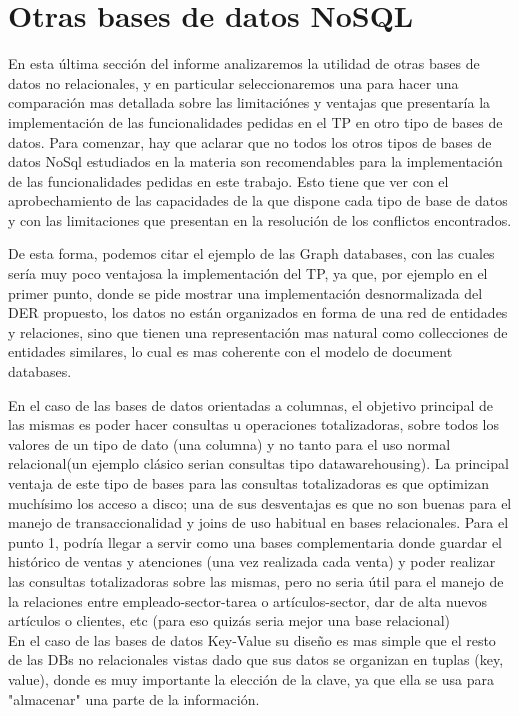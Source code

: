 \section{Otras bases de datos NoSQL}

En esta \'ultima secci\'on del informe analizaremos la utilidad de otras bases de datos no relacionales, y en particular seleccionaremos una para hacer una comparaci\'on mas detallada sobre las limitaci\'ones y ventajas que presentar\'ia la implementaci\'on de las funcionalidades pedidas en el TP en otro tipo de bases de datos. Para comenzar, hay que aclarar que no todos los otros tipos de bases de datos NoSql estudiados en la materia son recomendables para la implementaci\'on de las funcionalidades pedidas en este trabajo. Esto tiene que ver con el aprobechamiento de las capacidades de la que dispone cada tipo de base de datos y con las limitaciones que presentan en la resoluci\'on de los conflictos encontrados. 

De esta forma, podemos citar el ejemplo de las Graph databases, con las cuales ser\'ia muy poco ventajosa la implementaci\'on del TP, ya que, por ejemplo en el primer punto, donde se pide mostrar una implementaci\'on desnormalizada del DER propuesto, los datos no est\'an organizados en forma de una red de entidades y relaciones, sino que tienen una representaci\'on mas natural como collecciones de entidades similares, lo cual es mas coherente con el modelo de document databases.

En el caso de las bases de datos orientadas a columnas, el objetivo principal de las mismas es poder hacer consultas u operaciones totalizadoras, sobre todos los valores de un tipo de dato (una columna) y no tanto para el uso normal relacional(un ejemplo clásico serian consultas tipo datawarehousing). La principal ventaja de este tipo de bases para las consultas totalizadoras es que optimizan muchísimo los acceso a disco; una de sus desventajas es que no son buenas para el manejo de transaccionalidad y joins de uso habitual en bases relacionales.
Para el punto 1, podría llegar a servir como una bases complementaria donde guardar el histórico de ventas y atenciones (una vez realizada cada venta) y poder realizar las consultas totalizadoras sobre las mismas, pero no seria útil para el manejo de la relaciones entre empleado-sector-tarea o artículos-sector, dar de alta nuevos artículos o clientes, etc (para eso quizás seria mejor una base relacional) \\

En el caso de las bases de datos Key-Value su dise\~no es mas simple que el resto de las DBs no relacionales vistas dado que sus datos se organizan en tuplas (key, value), donde es muy importante la elecci\'on de la clave, ya que ella se usa para "almacenar" una parte de la informaci\'on. \\

